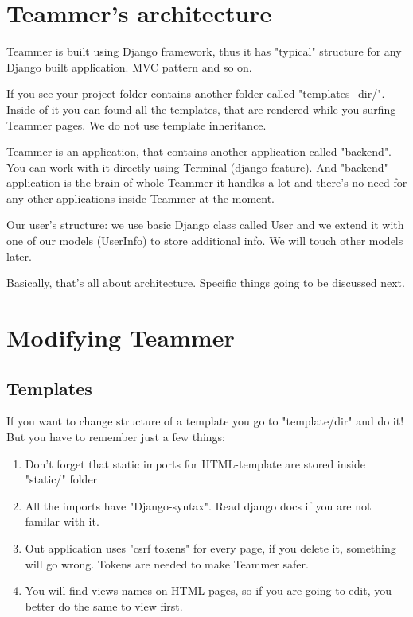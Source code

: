 \documentclass{report}
\begin{document}
\section{Teammer’s architecture}
Teammer is built using Django framework, thus it has "typical" structure for any Django built application. MVC pattern and so on.

If you see your project folder contains another folder called "templates\_dir/". Inside of it you can found all the templates, that are rendered while you surfing Teammer pages. We do not use template inheritance.

Teammer is an application, that contains another application called "backend". You can work with it directly using Terminal (django feature). And "backend" application is the brain of whole Teammer it handles a lot and there’s no need for any other applications inside Teammer at the moment.

Our user's structure: we use basic Django class called User and we extend it with one of our models (UserInfo) to store additional info. We will touch other models later.

Basically, that’s all about architecture. Specific things going to be discussed next.

\section{Modifying Teammer}
\subsection{Templates}
If you want to change structure of a template you go to "template/dir" and do it! But you have to remember just a few things:
\begin{enumerate}
\item Don’t forget that static imports for HTML-template are stored inside "static/" folder
\item All the imports have "Django-syntax". Read django docs if you are not familar with it.
\item Out application uses "csrf tokens" for every page, if you delete it, something will go wrong. Tokens are needed to make Teammer safer.
\item You will find views names on HTML pages, so if you are going to edit, you better do the same to view first.
\end{enumerate}
\end{document}
